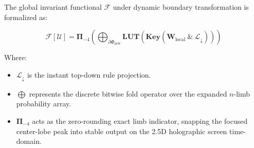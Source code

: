 The global invariant functional \(\mathcal{F}\) under dynamic boundary transformation is formalized as:

\[
\mathcal{F}[\mathcal{U}] = \mathbf{\Pi}_{-4} \left( \bigoplus_{\partial\Phi_{\text{new}}} \mathbf{LUT}\left( \mathbf{Key}\left( \mathbf{W}_{\text{local}} \ \& \ \mathcal{L}_{\downarrow} \right) \right) \right)
\]

Where:

\begin{itemize}
\item \(\mathcal{L}_{\downarrow}\) is the instant top-down rule projection.
\item \(\bigoplus\) represents the discrete bitwise fold operator over the expanded \(n\)-limb probability array.
\item \(\mathbf{\Pi}_{-4}\) acts as the zero-rounding exact limb indicator, snapping the focused center-lobe peak into stable output on the 2.5D holographic screen time-domain.
\end{itemize}
